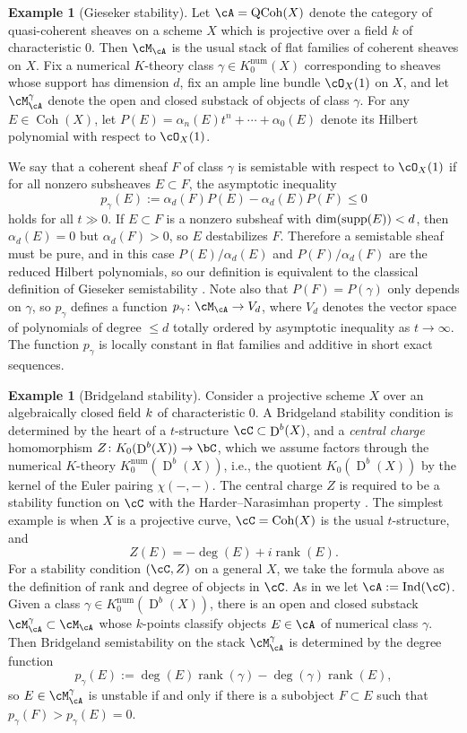\documentclass[a4paper]{amsart}
\numberwithin{equation}{section}
\theoremstyle{plain}
\theoremstyle{definition}
\newtheorem{ex}[thm]{Example}
\newcommand{\op}[1]{\!\!\mathop{\rm ~#1}\nolimits}
\DeclareMathOperator{\D}{D}
\DeclareMathOperator{\Ind}{Ind}
\DeclareMathOperator{\Coh}{Coh}
\DeclareMathOperator{\QCoh}{QCoh}
\DeclareMathOperator{\rank}{rank}
\newcommand{\co}{\colon}
\DeclareMathOperator{\num}{num}
\def\p{p}
\begin{document}
\begin{ex}[Gieseker stability]
Let $\cA = \QCoh(X)$ denote the category of quasi-coherent sheaves on a scheme $X$ which is projective over a field $k$ of characteristic 0. Then $\cM_\cA$ is the usual stack of flat families of coherent sheaves on $X$. Fix a numerical $K$-theory class $\gamma \in K_0^{\num}(X)$ corresponding to sheaves whose support has dimension $d$, fix an ample line bundle $\cO_X(1)$ on $X$, and let $\cM_\cA^\gamma$ denote the open and closed substack of objects of class $\gamma$. For any $E \in \Coh(X)$, let $P(E) = \alpha_n(E) t^n + \cdots + \alpha_0(E)$ denote its Hilbert polynomial with respect to $\cO_X(1)$.

We say that a coherent sheaf $F$ of class $\gamma$ is semistable with respect to $\cO_X(1)$ if for all nonzero subsheaves $E \subset F$, the asymptotic inequality
\[
p_\gamma(E) := \alpha_d(F) P(E) - \alpha_d(E) P(F) \le 0
\]
holds for all $t \gg 0$. If $E \subset F$ is a nonzero subsheaf with $\dim(\op{supp}(E)) < d$, then $\alpha_d(E) =0$ but $\alpha_d(F) >0$, so $E$ destabilizes $F$. Therefore a semistable sheaf must be pure, and in this case $P(E) / \alpha_d(E)$ and $P(F)/\alpha_d(F)$ are the reduced Hilbert polynomials, so our definition is equivalent to the classical definition of Gieseker semistability \cite[Def.~1.2.4]{huybrechtslehn}. Note also that $P(F) = P(\gamma)$ only depends on $\gamma$, so $p_\gamma$ defines a function $p_\gamma \co \cM_\cA \to V_d$, where $V_d$ denotes the vector space of polynomials of degree $\leq d$ totally ordered by asymptotic inequality as $t \to \infty$. The function $p_\gamma$ is locally constant in flat families and additive in short exact sequences.
\end{ex}


\begin{ex}[Bridgeland stability]
	Consider a projective scheme $X$ over an algebraically closed field ${k}$ of characteristic $0$. A Bridgeland stability condition is determined by the heart of a $t$-structure $\cC \subset \D^b(X)$, and a \emph{central charge} homomorphism $Z \co K_0(\D^b(X)) \to \bC$, which we assume factors through the numerical $K$-theory $K_0^{\num}(\D^b(X))$, i.e., the quotient $K_0(\D^b(X))$ by the kernel of the Euler pairing $\chi(-,-)$. The central charge $Z$ is required to be a stability function on $\cC$ with the Harder--Narasimhan property \cite[Prop. 5.3]{bridgeland}.  The simplest example is  when $X$ is a projective curve, $\cC = \Coh(X)$ is the usual $t$-structure, and
	\[
	Z(E) = - \deg(E) + i \rank(E).
	\]
	For a stability condition $(\cC, Z)$ on a general $X$, we take the formula above as the definition of rank and degree of objects in $\cC$. As in  we let $\cA := \Ind(\cC)$. Given a class $\gamma \in K_0^{\num}(\D^b(X))$, there is an open and closed substack $\cM_\cA^\gamma \subset \cM_\cA$ whose $k$-points classify objects $E \in \cA$ of numerical class $\gamma$.
Then Bridgeland semistability on the stack $\cM_\cA^\gamma$ is determined by the degree function
	\[
	\p_\gamma(E) := \deg(E) \rank(\gamma) - \deg(\gamma) \rank(E),
	\]
	so $E \in \cM_\cA^\gamma$ is unstable if and only if there is a subobject $F \subset E$ such that $\p_\gamma(F)>\p_\gamma(E) = 0$.
\end{ex}
\end{document}
